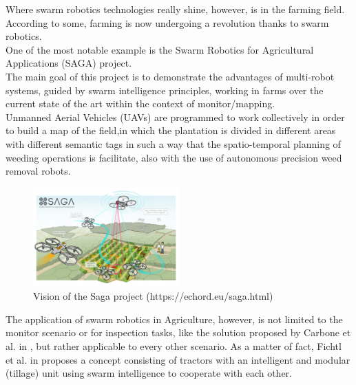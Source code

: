 \documentclass[conference]{IEEEtran}
\begin{document}
Where swarm robotics technologies really shine, however, is in the farming field. According to some, farming is now undergoing a revolution thanks to swarm robotics. \cite{revolution}\\
One of the most notable example is the Swarm Robotics for Agricultural Applications (SAGA) project. \cite{Albani:2017tp} \cite{AlbaniEtAl:BICT2019}\\
The main goal of this project is to demonstrate the advantages of multi-robot systems, guided by swarm intelligence principles, working in farms over the current state of the art within the context of monitor/mapping. \cite{Albani:2017tp}\\
Unmanned Aerial Vehicles (UAVs) are programmed to work collectively in order to build a map of the field,in which the plantation is divided in different areas with different semantic tags in such a way that the spatio-temporal planning of weeding operations is facilitate, also with the use of autonomous precision weed removal robots.

\begin{figure}[htb]
    \centering
    \includegraphics[width=0.5\textwidth]{img/saga.jpg}
    \caption{Vision of the Saga project (https://echord.eu/saga.html) }
    \label{fig:saga_project}
\end{figure}

The application of swarm robotics in Agriculture, however, is not limited to the monitor scenario or for inspection tasks, like the solution proposed by Carbone et al. in \cite{Carbone2018}, but rather applicable to every other scenario. As a matter of fact, Fichtl et al. in \cite{Fichtl2019FeldschwarmModularAS} proposes a concept consisting of tractors with an intelligent and modular (tillage) unit using swarm intelligence to cooperate with each other. 
\end{document}
